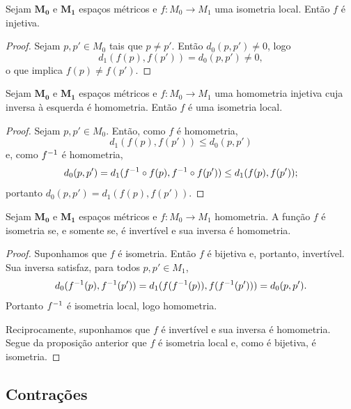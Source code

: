 \begin{prop}
Sejam $\bm{M_0}$ e $\bm{M_1}$ espaços métricos e $f\colon M_0 \to M_1$ uma isometria local. Então $f$ é injetiva.
\end{prop}
\begin{proof}
Sejam $p,p' \in M_0$ tais que $p \neq p'$. Então $d_0(p,p') \neq 0$, logo
	\begin{equation*}
	d_1(f(p),f(p')) = d_0(p,p') \neq 0,
	\end{equation*}
o que implica $f(p) \neq f(p')$.
\end{proof}

\begin{prop}
Sejam $\bm{M_0}$ e $\bm{M_1}$ espaços métricos e $f\colon M_0 \to M_1$ uma homometria injetiva cuja inversa à esquerda é homometria. Então $f$ é uma isometria local.
\end{prop}
\begin{proof}
Sejam $p,p' \in M_0$. Então, como $f$ é homometria,
	\begin{equation*}
	d_1(f(p),f(p')) \leq d_0(p,p')
	\end{equation*}
e, como $f^{-1}$ é homometria,
	\begin{equation*}
	d_0(p,p') = d_1(f^{-1} \circ f(p),f^{-1} \circ f(p')) \leq d_1(f(p),f(p'));
	\end{equation*}
portanto  $d_0(p,p') = d_1(f(p),f(p'))$.
\end{proof}

\begin{prop}
Sejam $\bm{M_0}$ e $\bm{M_1}$ espaços métricos e $f\colon M_0 \to M_1$ homometria. A função $f$ é isometria se, e somente se, é invertível e sua inversa é homometria.
\end{prop}
\begin{proof}
Suponhamos que $f$ é isometria. Então $f$ é bijetiva e, portanto, invertível. Sua inversa satisfaz, para todos $p,p' \in M_1$,
	\begin{equation*}
	d_0(f^{-1}(p),f^{-1}(p')) = d_1(f(f^{-1}(p)),f(f^{-1}(p'))) = d_0(p,p').
	\end{equation*}
Portanto $f^{-1}$ é isometria local, logo homometria.

Reciprocamente, suponhamos que $f$ é invertível e sua inversa é homometria. Segue da proposição anterior que $f$ é isometria local e, como é bijetiva, é isometria.
\end{proof}

\subsection{Contrações}

